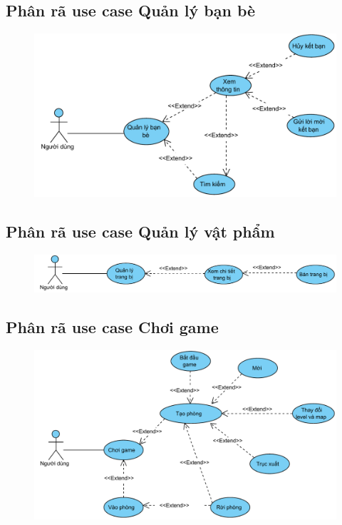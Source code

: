 \documentclass[3p]{elsarticle}
\begin{document}
\subsection{Phân rã use case Quản lý bạn bè}
\begin{figure}[!htbp]
	\hspace*{.5in}
	\centering
	\includegraphics[scale=.7]{images/usecases/gamer_FriendManagement.pdf}
\end{figure}
\newpage
\subsection{Phân rã use case Quản lý vật phẩm}
\begin{figure}[!htbp]
	\hspace*{-.5in}
	\centering
	\includegraphics[scale=.7]{images/usecases/gamer_ItemsManagement.pdf}
\end{figure}
\subsection{Phân rã use case Chơi game}
\begin{figure}[!htbp]
	\hspace*{.5in}
	\centering
	\includegraphics[scale=.7]{images/usecases/gamer_PlayGame.pdf}
\end{figure}
\newpage
\end{document}
